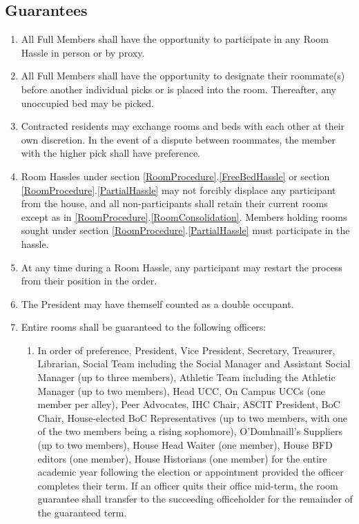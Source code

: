 \documentclass[10pt]{article} %
\begin{document}
\subsection{Guarantees}
\label{Guarantees}
\begin{enumerate}
\item All Full Members shall have the opportunity to participate in any Room Hassle in person or by proxy.
\item All Full Members shall have the opportunity to designate their roommate(s) before another individual picks or is placed into the room. Thereafter, any unoccupied bed may be picked.
\item Contracted residents may exchange rooms and beds with each other at their own discretion. In the event of a dispute between roommates, the member with the higher pick shall have preference.
\item Room Hassles under section \ref{RoomProcedure}.\ref{FreeBedHassle} or section \ref{RoomProcedure}.\ref{PartialHassle} may not forcibly displace any participant from the house, and all non-participants shall retain their current rooms except as in \ref{RoomProcedure}.\ref{RoomConsolidation}. Members holding rooms sought under section \ref{RoomProcedure}.\ref{PartialHassle} must participate in the hassle.
\item At any time during a Room Hassle, any participant may restart the process from their position in the order.
\item The President may have themself counted as a double occupant.
\item Entire rooms shall be guaranteed to the following officers:
\begin{enumerate}
\item In order of preference, President, Vice President, Secretary, Treasurer, Librarian, Social Team including the Social Manager and Assistant Social Manager (up to three members), Athletic Team including the Athletic Manager (up to two members), Head UCC, On Campus UCCs (one member per alley), Peer Advocates, IHC Chair, ASCIT President, BoC Chair, House-elected BoC Representatives (up to two members, with one of the two members being a rising sophomore), O’Domhnaill’s Suppliers (up to two members), House Head Waiter (one member), House BFD editors (one member), House Historians (one member) for the entire academic year following the election or appointment provided the officer completes their term. If an officer quits their office mid-term, the room guarantee shall transfer to the succeeding officeholder for the remainder of the guaranteed term.

\end{enumerate}
\end{enumerate}
\end{document}
